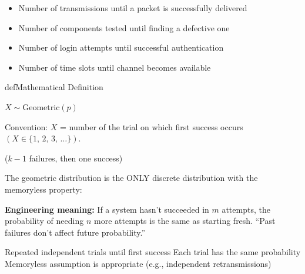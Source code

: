 
\begin{itemize}
\tightlist
\item
  Number of transmissions until a packet is successfully delivered
\item
  Number of components tested until finding a defective one
\item
  Number of login attempts until successful authentication
\item
  Number of time slots until channel becomes available
\end{itemize}

\begin{PSbox}[unbreakable]{def}{Mathematical Definition}

$X \sim \mathrm{Geometric}(p)$

Convention: $X$ = number of the trial on which first success occurs $(X \in \{1,\, 2,\, 3,\, \ldots \})$.

\end{PSbox}



($k-1$ failures, then one success)








The geometric distribution is the ONLY discrete distribution with the memoryless property:


\textbf{Engineering meaning:} If a system hasn’t succeeded in $m$ attempts, the probability of needing $n$ more attempts is the same as starting fresh. ``Past failures don’t affect future probability.''


\PSyes{} Repeated independent trials until first success\PSbr{}\PSyes{} Each trial has the same probability\PSbr{}\PSyes{} Memoryless assumption is appropriate (e.g., independent retransmissions)

